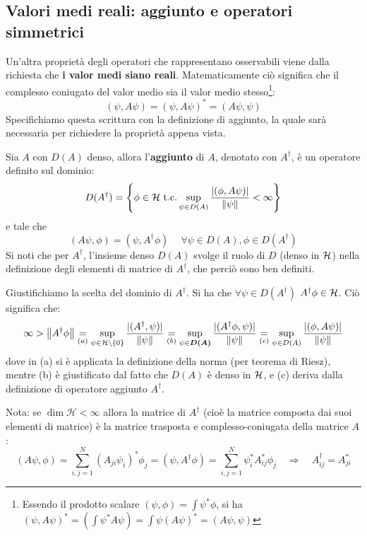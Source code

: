 \documentclass[FisicaTeorica.tex]{subfiles}
\begin{document}
\subsection{Valori medi reali: aggiunto e operatori simmetrici}
Un'altra proprietà degli operatori che rappresentano osservabili viene dalla richiesta che \textbf{i valor medi siano reali}. Matematicamente ciò significa che il complesso coniugato del valor medio sia il valor medio stesso\footnote{Essendo il prodotto scalare $(\psi, \phi) = \int \psi^* \phi$, si ha $(\psi, A\psi)^* = \left (\int \psi^* A\psi\right ) = \int \psi (A\psi)^* = (A\psi, \psi)$}:
	\[
	\left(\psi,A\psi\right)=\left(\psi,A\psi\right)^*=\left(A\psi,\psi\right)
	\]
	Specifichiamo questa scrittura con la definizione di aggiunto, la quale sarà necessaria per richiedere la proprietà appena vista.
	\begin{dfn}
	Sia $A$ con $D(A)$ denso, allora l'\textbf{aggiunto} di $A$, denotato con $A^\dag$, è un operatore definito sul dominio:
	\[
	D(A^\dag) = \left \{\phi \in \mathcal{H} \text{ t.c.} \sup_{\psi \in D(A)} \frac{|(\phi, A\psi)|}{\left\lVert\psi\right\rVert}< \infty \right \}
	\]
	e tale che
	\[
	\left(A\psi,\phi\right)=\left(\psi,A^\dag\phi\right)\> \quad \forall \psi \in D\left(A\right), \phi \in D\left(A^\dag \right)
	\]
	Si noti che per $A^\dag$, l'insieme denso $D(A)$ svolge il ruolo di $D$ (denso in $\mathcal{H}$) nella definizione degli elementi di matrice di $A^\dag$, che perciò sono ben definiti.
	\end{dfn}
	\begin{appr}
	Giustifichiamo la scelta del dominio di $A^\dag$. Si ha che $\forall \psi \in D(A^\dag)$ $A^\dag \phi \in \mathcal{H}$. Ciò significa che:
	\[
	\infty > \left\lVert A^\dag \phi\right\rVert \underset{(a)}{=} \sup_{\psi \in \mathcal{H}\setminus \{0\}} \frac{|(A^\dag,\psi)|}{\left\lVert\psi\right\rVert} \underset{(b)}{=} \sup_{\psi \in \bm{D(A)}} \frac{|(A^\dag\phi, \psi)|}{\left\lVert\psi\right\rVert} \underset{(c)}{=} \sup_{\psi \in D(A)} \frac{|(\phi,A\psi)|}{\left\lVert\psi\right\rVert}
	\]
	dove in (a) si è applicata la definizione della norma (per teorema di Riesz), mentre (b) è giustificato dal fatto che $D(A)$ è denso in $\mathcal{H}$, e (c) deriva dalla definizione di operatore aggiunto $A^\dag$.
	\end{appr}
	Nota: se $\dim{\mathcal{H}<\infty}$ allora la matrice di $A^\dag$ (cioè la matrice composta dai suoi elementi di matrice) è la matrice trasposta e complesso-coniugata della matrice $A$:
	\[
	\left(A\psi,\phi\right)=\sum_{i,j=1}^{N}{\left(A_{ji}\psi_i\right)^*\phi_j=\left(\psi,A^\dag\phi\right)=\sum_{i,j=1}^{N}{\psi_i^* A_{ij}^*\phi_j} \quad \Rightarrow \quad A_{ij}^\dag=A_{ji}^*}
	\]
\end{document}
